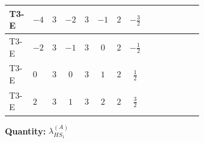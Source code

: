 \documentclass[8pt]{article}
\begin{document}
\begin{landscape}
\begin{longtable}{@{}llcccccc >{\raggedright\arraybackslash}p{0.21\linewidth} >{\raggedright\arraybackslash}p{0.21\linewidth} >{\raggedright\arraybackslash}p{0.21\linewidth}@{}}
\midrule
T3-E & $-4$ & $3$ & $-2$ & $3$ & $-1$ & $2$ & $-\frac{3}{2}$ & \scriptsize\adjustbox{max width=\linewidth}{$\begin{gathered} +2 {\lambda_1} {\lambda_{HS_1}^{(A)}}\end{gathered}$} & \scriptsize\adjustbox{max width=\linewidth}{$\begin{gathered} +8 {\lambda_{HS_1}^{(1)}} {\lambda_{HS_1}^{(A)}}\end{gathered}$} & \scriptsize\adjustbox{max width=\linewidth}{$\begin{gathered} +2 {\lambda_{HS_1}^{(A)}} {\lambda_{S_1}^{(1)}}\end{gathered}$} \\
\midrule
T3-E & $-2$ & $3$ & $-1$ & $3$ & $0$ & $2$ & $-\frac{1}{2}$ & \scriptsize\adjustbox{max width=\linewidth}{$\begin{gathered} +2 {\lambda_1} {\lambda_{HS_1}^{(A)}}\end{gathered}$} & \scriptsize\adjustbox{max width=\linewidth}{$\begin{gathered} +8 {\lambda_{HS_1}^{(1)}} {\lambda_{HS_1}^{(A)}}\end{gathered}$} & \scriptsize\adjustbox{max width=\linewidth}{$\begin{gathered} +2 {\lambda_{HS_1}^{(A)}} {\lambda_{S_1}^{(1)}}\end{gathered}$} \\
\midrule
T3-E & $0$ & $3$ & $0$ & $3$ & $1$ & $2$ & $\frac{1}{2}$ & \scriptsize\adjustbox{max width=\linewidth}{$\begin{gathered} +2 {\lambda_1} {\lambda_{HS_1}^{(A)}}\end{gathered}$} & \scriptsize\adjustbox{max width=\linewidth}{$\begin{gathered} +8 {\lambda_{HS_1}^{(1)}} {\lambda_{HS_1}^{(A)}}\end{gathered}$} & \scriptsize\adjustbox{max width=\linewidth}{$\begin{gathered} +2 {\lambda_{HS_1}^{(A)}} {\lambda_{S_1}^{(1)}}\end{gathered}$} \\
\midrule
T3-E & $2$ & $3$ & $1$ & $3$ & $2$ & $2$ & $\frac{3}{2}$ & \scriptsize\adjustbox{max width=\linewidth}{$\begin{gathered} +2 {\lambda_1} {\lambda_{HS_1}^{(A)}}\end{gathered}$} & \scriptsize\adjustbox{max width=\linewidth}{$\begin{gathered} +8 {\lambda_{HS_1}^{(1)}} {\lambda_{HS_1}^{(A)}}\end{gathered}$} & \scriptsize\adjustbox{max width=\linewidth}{$\begin{gathered} +2 {\lambda_{HS_1}^{(A)}} {\lambda_{S_1}^{(1)}}\end{gathered}$} \\
\midrule
\bottomrule
\end{longtable}
\clearpage
\noindent\textbf{Quantity: }$\lambda_{HS_1}^{(A)}$\par\smallskip

\end{landscape}
\end{document}
